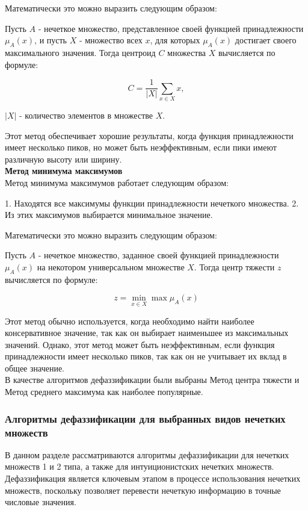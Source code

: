 \documentclass{article}
\begin{document}
    Математически это можно выразить следующим образом:

    Пусть $A$ - нечеткое множество, представленное своей функцией принадлежности $μ_A(x)$, и пусть $X$ - множество всех $x$, для которых $μ_A(x)$ достигает своего максимального значения. Тогда центроид $C$ множества $X$ вычисляется по формуле:

    $$C = \frac{1}{|X|} \sum_{x \in X} x,$$

    $|X|$ - количество элементов в множестве $X$.

    Этот метод обеспечивает хорошие результаты, когда функция принадлежности имеет несколько пиков, но может быть неэффективным, если пики имеют различную высоту или ширину.
    ~\\
    \textbf{Метод минимума максимумов}\\
    Метод минимума максимумов работает следующим образом:

    1. Находятся все максимумы функции принадлежности нечеткого множества.
    2. Из этих максимумов выбирается минимальное значение.

    Математически это можно выразить следующим образом:

    Пусть $A$ - нечеткое множество, заданное своей функцией принадлежности $\mu_A(x)$ на некотором универсальном множестве $X$. Тогда центр тяжести $z$ вычисляется по формуле:

    $$z = \min_{x \in X} \max \mu_A(x)$$

    Этот метод обычно используется, когда необходимо найти наиболее консервативное значение, так как он выбирает наименьшее из максимальных значений. Однако, этот метод может быть неэффективным, если функция принадлежности имеет несколько пиков, так как он не учитывает их вклад в общее значение.
    ~\\
    В качестве алгоритмов дефаззификации были выбраны Метод центра тяжести и Метод среднего максимума как наиболее популярные.

    \subsubsection{Алгоритмы дефаззификации для выбранных видов нечетких множеств}
    В данном разделе рассматриваются алгоритмы дефаззификации для нечетких множеств 1 и 2 типа, а также для интуиционистских нечетких множеств. Дефаззификация является ключевым этапом в процессе использования нечетких множеств, поскольку позволяет перевести нечеткую информацию в точные числовые значения.
\end{document}
